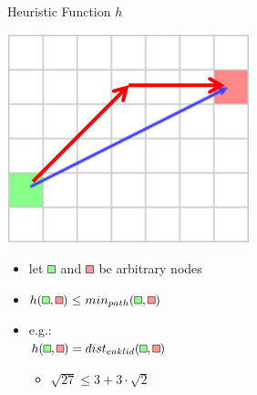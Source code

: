 \documentclass{presentation}
\newcommand{\rect}[1]{\tikz{\path[draw=black,fill=#1] (0,0) rectangle (2mm,2mm);}}
\newcommand{\grect}{\rect{white!60!green}}
\newcommand{\rrect}{\rect{white!60!red}}
\begin{document}
\begin{frame}{Heuristic Function $h$}
	\begin{minipage}{0.3\textwidth}
		\includegraphics[width=\textwidth]{figures/heuristic.png}
	\end{minipage}%
	\hfill%
	\begin{minipage}{0.6\textwidth}
		\begin{itemize}
		\item let $\grect$ and $\rrect$ be arbitrary nodes
		\pause
		\item $h(\grect, \rrect)\leq min_{path}(\grect,\rrect)$
		\pause
		\item e.g.:\\ $h(\grect, \rrect) = dist_{euklid}(\grect,\rrect)$
		\begin{itemize}
			\item $\sqrt{27} \leq 3+3\cdot\sqrt{2}$
		\end{itemize}
		\end{itemize}
	\end{minipage}
\end{frame}


\begin{frame}
\end{frame}
\end{document}

